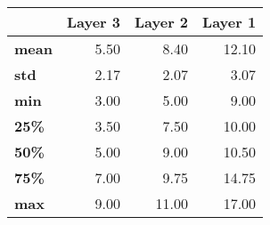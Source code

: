 \begin{tabular}{lrrr}
\toprule
{} &  Layer 3 &  Layer 2 &  Layer 1 \\
\midrule
\textbf{mean} &     5.50 &     8.40 &    12.10 \\
\textbf{std } &     2.17 &     2.07 &     3.07 \\
\textbf{min } &     3.00 &     5.00 &     9.00 \\
\textbf{25\% } &     3.50 &     7.50 &    10.00 \\
\textbf{50\% } &     5.00 &     9.00 &    10.50 \\
\textbf{75\% } &     7.00 &     9.75 &    14.75 \\
\textbf{max } &     9.00 &    11.00 &    17.00 \\
\bottomrule
\end{tabular}
